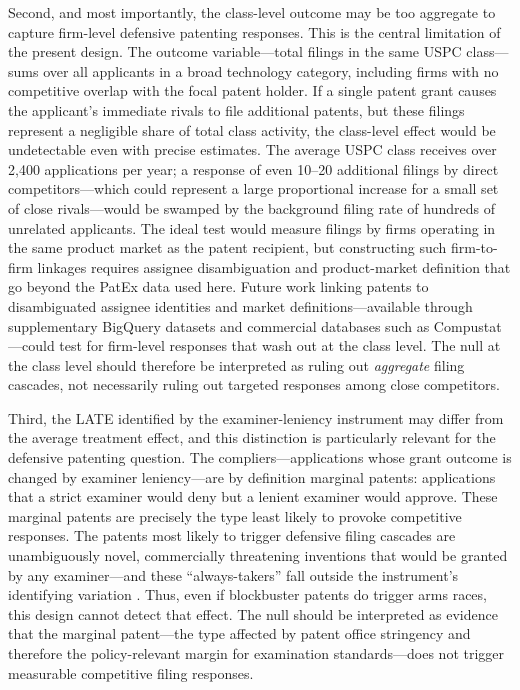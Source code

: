 \documentclass[12pt]{article}
\begin{document}
Second, and most importantly, the class-level outcome may be too aggregate to capture firm-level defensive patenting responses. This is the central limitation of the present design. The outcome variable---total filings in the same USPC class---sums over all applicants in a broad technology category, including firms with no competitive overlap with the focal patent holder. If a single patent grant causes the applicant's immediate rivals to file additional patents, but these filings represent a negligible share of total class activity, the class-level effect would be undetectable even with precise estimates. The average USPC class receives over 2,400 applications per year; a response of even 10--20 additional filings by direct competitors---which could represent a large proportional increase for a small set of close rivals---would be swamped by the background filing rate of hundreds of unrelated applicants. The ideal test would measure filings by firms operating in the same product market as the patent recipient, but constructing such firm-to-firm linkages requires assignee disambiguation and product-market definition that go beyond the PatEx data used here. Future work linking patents to disambiguated assignee identities and market definitions---available through supplementary BigQuery datasets and commercial databases such as Compustat---could test for firm-level responses that wash out at the class level. The null at the class level should therefore be interpreted as ruling out \emph{aggregate} filing cascades, not necessarily ruling out targeted responses among close competitors.

Third, the LATE identified by the examiner-leniency instrument may differ from the average treatment effect, and this distinction is particularly relevant for the defensive patenting question. The compliers---applications whose grant outcome is changed by examiner leniency---are by definition marginal patents: applications that a strict examiner would deny but a lenient examiner would approve. These marginal patents are precisely the type least likely to provoke competitive responses. The patents most likely to trigger defensive filing cascades are unambiguously novel, commercially threatening inventions that would be granted by any examiner---and these ``always-takers'' fall outside the instrument's identifying variation \citep{imbens1994}. Thus, even if blockbuster patents do trigger arms races, this design cannot detect that effect. The null should be interpreted as evidence that the marginal patent---the type affected by patent office stringency and therefore the policy-relevant margin for examination standards---does not trigger measurable competitive filing responses.
\end{document}

